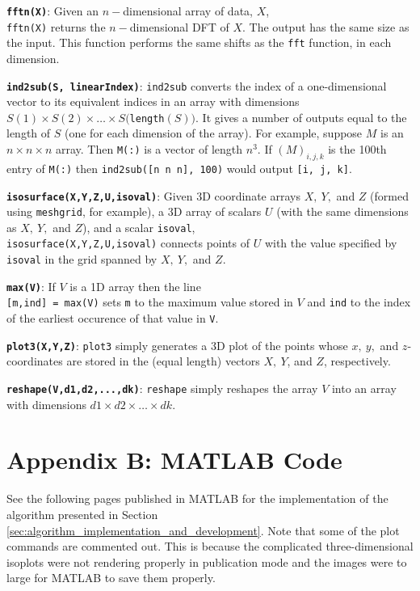 \documentclass[fleqn,10pt]{SelfArx} %
\begin{document}
\noindent \texttt{\textbf{fftn(X)}}: Given an $n-$dimensional array of data, $X$,\\ \texttt{fftn(X)} returns the $n-$dimensional DFT of $X$. The output has the same size as the input. This function performs the same shifts as the \texttt{fft} function, in each dimension.
\vskip 0.3cm

\noindent \texttt{\textbf{ind2sub(S, linearIndex)}}: \texttt{ind2sub} converts the index of a one-dimensional vector to its equivalent indices in an array with dimensions $S(1)\times S(2)\times \dots \times S($\texttt{length}$(S))$. It gives a number of outputs equal to the length of $S$ (one for each dimension of the array). For example, suppose $M$ is an $n\times n\times n$ array. Then \texttt{M(:)} is a vector of length $n^3$. If $(M)_{i,j,k}$ is the 100th entry of \texttt{M(:)} then \texttt{ind2sub([n n n], 100)} would output \texttt{[i, j, k]}.
\vskip 0.3cm

\noindent \texttt{\textbf{isosurface(X,Y,Z,U,isoval)}}: Given 3D coordinate arrays $X,~Y,$ and $Z$ (formed using \texttt{meshgrid}, for example), a 3D array of scalars $U$ (with the same dimensions as $X,~Y,$ and $Z$), and a scalar \texttt{isoval},\\ \texttt{isosurface(X,Y,Z,U,isoval)} connects points of $U$ with the value specified by \texttt{isoval} in the grid spanned by $X,~Y,$ and $Z$.
\vskip 0.3cm

\noindent \texttt{\textbf{max(V)}}: If $V$ is a 1D array then the line \\ \texttt{[m,ind] = max(V)} sets \texttt{m} to the maximum value stored in $V$ and \texttt{ind} to the index of the earliest occurence of that value in \texttt{V}.
\vskip 0.3cm

\noindent \texttt{\textbf{plot3(X,Y,Z)}}: \texttt{plot3} simply generates a 3D plot of the points whose $x,~y,$ and $z$-coordinates are stored in the (equal length) vectors $X,~Y$, and $Z$, respectively.
\vskip 0.3cm

\noindent \texttt{\textbf{reshape(V,d1,d2,...,dk)}}: \texttt{reshape} simply reshapes the array $V$ into an array with dimensions $d1\times d2\times \dots \times dk$.
\vskip 0.3cm


\section*{Appendix B: MATLAB Code}
See the following pages published in MATLAB for the implementation of the algorithm presented in Section \ref{sec:algorithm_implementation_and_development}. Note that some of the plot commands are commented out. This is because the complicated three-dimensional isoplots were not rendering properly in publication mode and the images were to large for MATLAB to save them properly.
\end{document}
